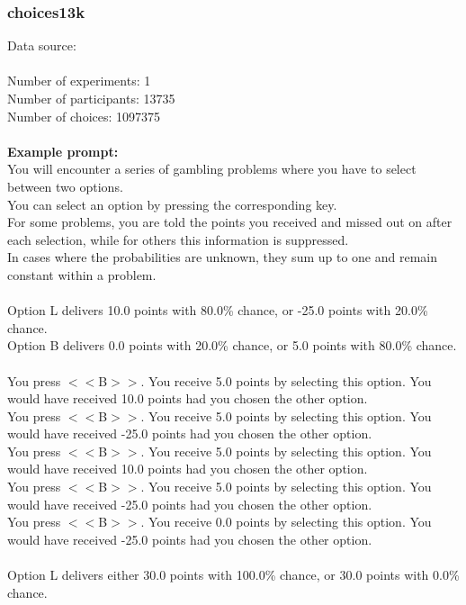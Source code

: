\documentclass[pdflatex,sn-nature]{sn-jnl}%
\theoremstyle{thmstyleone}%
\theoremstyle{thmstyletwo}%
\theoremstyle{thmstylethree}%
\begin{document}
\subsubsection*{choices13k}
Data source: \cite{peterson2021using} \\ $~$ \\
Number of experiments: 1 $~$\\ 
Number of participants: 13735 $~$\\ 
Number of choices: 1097375 $~$\\ 
 $~$\\ 
\textbf{Example prompt:}
 $~$\\ 
You will encounter a series of gambling problems where you have to select between two options. $~$\\ 
You can select an option by pressing the corresponding key. $~$\\ 
For some problems, you are told the points you received and missed out on after each selection, while for others this information is suppressed. $~$\\ 
In cases where the probabilities are unknown, they sum up to one and remain constant within a problem. $~$\\ 
 $~$\\ 
Option L delivers 10.0 points with 80.0\% chance, or -25.0 points with 20.0\% chance. $~$\\ 
Option B delivers 0.0 points with 20.0\% chance, or 5.0 points with 80.0\% chance. $~$\\ 
You press $<<$B$>>$. You receive 5.0 points by selecting this option. You would have received 10.0 points had you chosen the other option. $~$\\ 
You press $<<$B$>>$. You receive 5.0 points by selecting this option. You would have received -25.0 points had you chosen the other option. $~$\\ 
You press $<<$B$>>$. You receive 5.0 points by selecting this option. You would have received 10.0 points had you chosen the other option. $~$\\ 
You press $<<$B$>>$. You receive 5.0 points by selecting this option. You would have received -25.0 points had you chosen the other option. $~$\\ 
You press $<<$B$>>$. You receive 0.0 points by selecting this option. You would have received -25.0 points had you chosen the other option. $~$\\ 
 $~$\\ 
Option L delivers either 30.0 points with 100.0\% chance, or 30.0 points with 0.0\% chance. $~$\\ 
\end{document}

